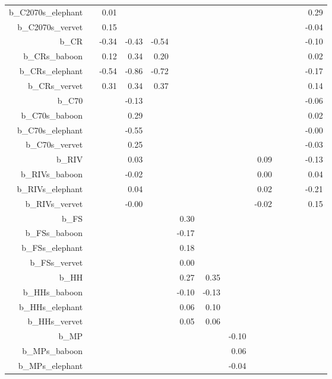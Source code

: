 \begin{table}[ht]
\begin{tabular}{rrrrrrrrrrrrr}
  b\_C2070s\_elephant &  & 0.01 &  &  &  &  &  &  &  &  &  & 0.29 \\ 
  b\_C2070s\_vervet &  & 0.15 &  &  &  &  &  &  &  &  &  & -0.04 \\ 
  b\_CR &  & -0.34 & -0.43 & -0.54 &  &  &  &  &  &  &  & -0.10 \\ 
  b\_CRs\_baboon &  & 0.12 & 0.34 & 0.20 &  &  &  &  &  &  &  & 0.02 \\ 
  b\_CRs\_elephant &  & -0.54 & -0.86 & -0.72 &  &  &  &  &  &  &  & -0.17 \\ 
  b\_CRs\_vervet &  & 0.31 & 0.34 & 0.37 &  &  &  &  &  &  &  & 0.14 \\ 
  b\_C70 &  &  & -0.13 &  &  &  &  &  &  &  &  & -0.06 \\ 
  b\_C70s\_baboon &  &  & 0.29 &  &  &  &  &  &  &  &  & 0.02 \\ 
  b\_C70s\_elephant &  &  & -0.55 &  &  &  &  &  &  &  &  & -0.00 \\ 
  b\_C70s\_vervet &  &  & 0.25 &  &  &  &  &  &  &  &  & -0.03 \\ 
  b\_RIV &  &  & 0.03 &  &  &  &  & 0.09 &  &  &  & -0.13 \\ 
  b\_RIVs\_baboon &  &  & -0.02 &  &  &  &  & 0.00 &  &  &  & 0.04 \\ 
  b\_RIVs\_elephant &  &  & 0.04 &  &  &  &  & 0.02 &  &  &  & -0.21 \\ 
  b\_RIVs\_vervet &  &  & -0.00 &  &  &  &  & -0.02 &  &  &  & 0.15 \\ 
  b\_FS &  &  &  &  & 0.30 &  &  &  &  &  &  &  \\ 
  b\_FSs\_baboon &  &  &  &  & -0.17 &  &  &  &  &  &  &  \\ 
  b\_FSs\_elephant &  &  &  &  & 0.18 &  &  &  &  &  &  &  \\ 
  b\_FSs\_vervet &  &  &  &  & 0.00 &  &  &  &  &  &  &  \\ 
  b\_HH &  &  &  &  & 0.27 & 0.35 &  &  &  &  &  &  \\ 
  b\_HHs\_baboon &  &  &  &  & -0.10 & -0.13 &  &  &  &  &  &  \\ 
  b\_HHs\_elephant &  &  &  &  & 0.06 & 0.10 &  &  &  &  &  &  \\ 
  b\_HHs\_vervet &  &  &  &  & 0.05 & 0.06 &  &  &  &  &  &  \\ 
  b\_MP &  &  &  &  &  &  & -0.10 &  &  &  &  &  \\ 
  b\_MPs\_baboon &  &  &  &  &  &  & 0.06 &  &  &  &  &  \\ 
  b\_MPs\_elephant &  &  &  &  &  &  & -0.04 &  &  &  &  &  \\ 

\end{tabular}
\end{table}
